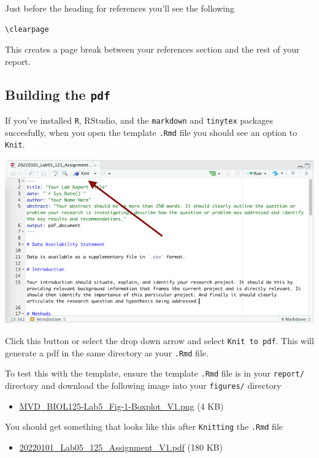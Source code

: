 \documentclass[
]{book}
\providecommand{\tightlist}{%
  \setlength{\itemsep}{0pt}\setlength{\parskip}{0pt}}
\begin{document}
Just before the heading for references you'll see the following

\begin{verbatim}
\clearpage
\end{verbatim}

This creates a page break between your references section and the rest of your report.

\hypertarget{building-the-pdf}{%
\subsection*{\texorpdfstring{Building the \texttt{pdf}}{Building the pdf}}\label{building-the-pdf}}

If you've installed \texttt{R}, RStudio, and the \texttt{markdown} and \texttt{tinytex} packages succesfully, when you open the template \texttt{.Rmd} file you should see an option to \texttt{Knit}.

\includegraphics{images/Knit_20220101.png}

Click this button or select the drop down arrow and select \texttt{Knit\ to\ pdf}. This will generate a pdf in the same directory as your \texttt{.Rmd} file.

To test this with the template, ensure the template \texttt{.Rmd} file is in your \texttt{report/} directory and download the following image into your \texttt{figures/} directory

\begin{itemize}
\tightlist
\item
  \href{files/figures/MVD_BIOL125-Lab5_Fig-1-Boxplot_V1.png}{MVD\_BIOL125-Lab5\_Fig-1-Boxplot\_V1.png} (4 KB)
\end{itemize}

You should get something that looks like this after \texttt{Knitting} the \texttt{.Rmd} file

\begin{itemize}
\tightlist
\item
  \href{files/20220101_Lab05_125_Assignment_V1.pdf}{20220101\_Lab05\_125\_Assignment\_V1.pdf} (180 KB)
\end{itemize}
\end{document}

